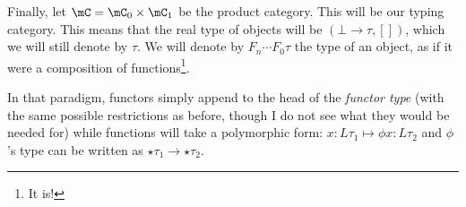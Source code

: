 \documentclass[math, english, info]{cours}
\begin{document}
Finally, let $\mC = \mC_{0} \times \mC_{1}$ be the product category. This will be our typing category.
This means that the real type of objects will be $\left( \bot \to \tau, [] \right)$, which we will still denote by $\tau$.
We will denote by $F_{n} \cdots F_{0} \tau$ the type of an object, as if it were a composition of functions\footnote{It is!}.

In that paradigm, functors simply append to the head of the \emph{functor type} (with the same possible restrictions as before, though I do not see what they would be needed for) while functions will take a polymorphic form:
$x: L\tau_{1} \mapsto \phi x: L\tau_{2}$ and $\phi$'s type can be written as $\star\tau_{1} \to \star\tau_{2}$.




\end{document}
